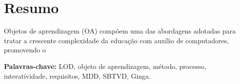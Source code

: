 \chapter*{Resumo}


Objetos de aprendizagem (OA) compõem uma das abordagens adotadas para tratar a
crescente complexidade da educação com auxílio de computadores, promovendo o



\vspace{1cm}
\noindent
\textbf{Palavras-chave:} LOD, objeto de aprendizagem, método, processo,
interatividade, requisitos, MDD, SBTVD, Ginga.
